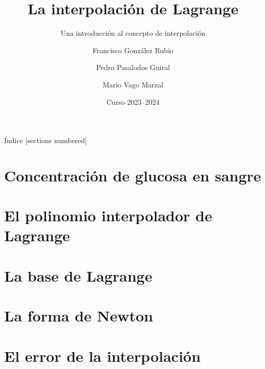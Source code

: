 \documentclass{beamer}
\title{La interpolación de Lagrange}
\subtitle{Una introducción al concepto de interpolación}
\author{Francisco González Rubio \and Pedro Pasalodos Guiral%
  \and Mario Vago Marzal}
\date{Curso 2023--2024}
\institute{Universitat de València}
\begin{document}
  {
    \vfuzz=16pt
    \maketitle
  }

  \begin{frame}{Índice}
    [sections numbered]
    \tableofcontents
  \end{frame}

  \section{Concentración de glucosa en sangre}

  \section{El polinomio interpolador de Lagrange}

  \section{La base de Lagrange}

  \section{La forma de Newton}

  \section{El error de la interpolación}
\end{document}
